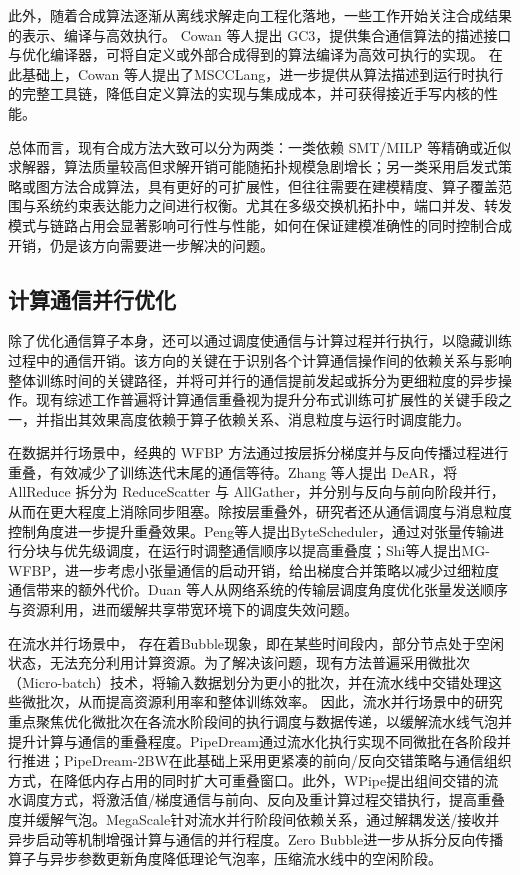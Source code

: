 此外，随着合成算法逐渐从离线求解走向工程化落地，一些工作开始关注合成结果的表示、编译与高效执行。
Cowan 等人\cite{cowan2022gc3}提出 GC3，提供集合通信算法的描述接口与优化编译器，可将自定义或外部合成得到的算法编译为高效可执行的实现。
在此基础上，Cowan 等人\cite{cowan2023mscclang}提出了MSCCLang，进一步提供从算法描述到运行时执行的完整工具链，降低自定义算法的实现与集成成本，并可获得接近手写内核的性能。

总体而言，现有合成方法大致可以分为两类：一类依赖 SMT/MILP 等精确或近似求解器，算法质量较高但求解开销可能随拓扑规模急剧增长；另一类采用启发式策略或图方法合成算法，具有更好的可扩展性，但往往需要在建模精度、算子覆盖范围与系统约束表达能力之间进行权衡。尤其在多级交换机拓扑中，端口并发、转发模式与链路占用会显著影响可行性与性能，如何在保证建模准确性的同时控制合成开销，仍是该方向需要进一步解决的问题。



\subsection{计算通信并行优化}

除了优化通信算子本身，还可以通过调度使通信与计算过程并行执行，以隐藏训练过程中的通信开销。该方向的关键在于识别各个计算通信操作间的依赖关系与影响整体训练时间的关键路径，并将可并行的通信提前发起或拆分为更细粒度的异步操作。现有综述工作普遍将计算通信重叠视为提升分布式训练可扩展性的关键手段之一，并指出其效果高度依赖于算子依赖关系、消息粒度与运行时调度能力\cite{ouyang2021communication}。

在数据并行场景中，经典的 WFBP 方法\cite{zhang2017poseidon}通过按层拆分梯度并与反向传播过程进行重叠，有效减少了训练迭代末尾的通信等待。Zhang 等人\cite{zhang2023dear}提出 DeAR，将 AllReduce 拆分为 ReduceScatter 与 AllGather，并分别与反向与前向阶段并行，从而在更大程度上消除同步阻塞。除按层重叠外，研究者还从通信调度与消息粒度控制角度进一步提升重叠效果。Peng等人\cite{peng2019generic}提出ByteScheduler，通过对张量传输进行分块与优先级调度，在运行时调整通信顺序以提高重叠度；Shi等人\cite{shi2021mg}提出MG-WFBP，进一步考虑小张量通信的启动开销，给出梯度合并策略以减少过细粒度通信带来的额外代价。Duan 等人\cite{duan2023accelerating}从网络系统的传输层调度角度优化张量发送顺序与资源利用，进而缓解共享带宽环境下的调度失效问题。

在流水并行场景中，
存在着Bubble现象，即在某些时间段内，部分节点处于空闲状态，无法充分利用计算资源。为了解决该问题，现有方法普遍采用微批次（Micro-batch）技术，将输入数据划分为更小的批次，并在流水线中交错处理这些微批次，从而提高资源利用率和整体训练效率。
因此，流水并行场景中的研究重点聚焦优化微批次在各流水阶段间的执行调度与数据传递，以缓解流水线气泡并提升计算与通信的重叠程度。PipeDream\cite{narayanan2019pipedream}通过流水化执行实现不同微批在各阶段并行推进；PipeDream-2BW\cite{narayanan2021memory}在此基础上采用更紧凑的前向/反向交错策略与通信组织方式，在降低内存占用的同时扩大可重叠窗口。此外，WPipe\cite{yang2022group}提出组间交错的流水调度方式，将激活值/梯度通信与前向、反向及重计算过程交错执行，提高重叠度并缓解气泡。MegaScale\cite{jiang2024megascale}针对流水并行阶段间依赖关系，通过解耦发送/接收并异步启动等机制增强计算与通信的并行程度。Zero Bubble\cite{qi2024zero}进一步从拆分反向传播算子与异步参数更新角度降低理论气泡率，压缩流水线中的空闲阶段。

